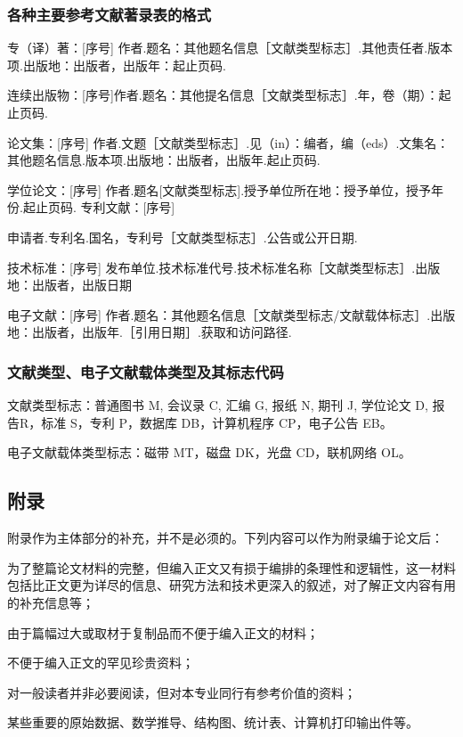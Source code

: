 \documentclass[a4paper,12pt,oneside,openany]{book}
\begin{document}
\subsubsection{各种主要参考文献著录表的格式}

专（译）著：{[}序号{]} 作者.题名：其他题名信息［文献类型标志］.其他责任者.版本项.出版地：出版者，出版年：起止页码.

连续出版物：{[}序号{]}作者.题名：其他提名信息［文献类型标志］.年，卷（期）：起止页码.

论文集：{[}序号{]} 作者.文题［文献类型标志］.见（in）：编者，编（eds）.文集名：其他题名信息.版本项.出版地：出版者，出版年.起止页码.

学位论文：{[}序号{]} 作者.题名{[}文献类型标志{]}.授予单位所在地：授予单位，授予年份.起止页码. 专利文献：{[}序号{]}

申请者.专利名.国名，专利号［文献类型标志］.公告或公开日期.

技术标准：{[}序号{]} 发布单位.技术标准代号.技术标准名称［文献类型标志］.出版地：出版者，出版日期

电子文献：{[}序号{]} 作者.题名：其他题名信息［文献类型标志/文献载体标志］.出版地：出版者，出版年.［引用日期］.获取和访问路径. 


\subsubsection{文献类型、电子文献载体类型及其标志代码}

文献类型标志：普通图书 M, 会议录 C, 汇编 G, 报纸 N, 期刊 J, 学位论文 D, 报告R，标准 S，专利 P，数据库
DB，计算机程序 CP，电子公告 EB。

电子文献载体类型标志：磁带 MT，磁盘 DK，光盘 CD，联机网络 OL。 


\subsection{附录}

附录作为主体部分的补充，并不是必须的。下列内容可以作为附录编于论文后：

为了整篇论文材料的完整，但编入正文又有损于编排的条理性和逻辑性，这一材料包括比正文更为详尽的信息、研究方法和技术更深入的叙述，对了解正文内容有用的补充信息等； 

由于篇幅过大或取材于复制品而不便于编入正文的材料；

不便于编入正文的罕见珍贵资料；

对一般读者并非必要阅读，但对本专业同行有参考价值的资料；

某些重要的原始数据、数学推导、结构图、统计表、计算机打印输出件等。
\end{document}
